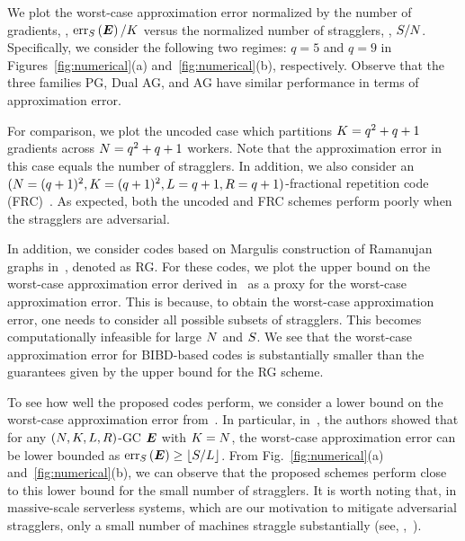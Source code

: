 \documentclass[conference,letterpaper]{IEEEtran}
\begin{document}
We plot the worst-case approximation error normalized by the number of gradients, \ie, $\mathrm{err}_{S}\left(\boldsymbol{E}\right)/K$ versus the normalized number of stragglers, \ie, $S/N$. Specifically, we consider the following two regimes: $q = 5$ and $q = 9$ in Figures~\ref{fig:numerical}(a) and~\ref{fig:numerical}(b), respectively. Observe that the three families PG, Dual AG, and AG have similar performance in terms of approximation error.

For comparison, we plot the uncoded case which partitions $K = q^2+q+1$ gradients across $N = q^2+q+1$ workers. Note that the approximation error in this case equals the number of stragglers. 
In addition, we also consider an \mbox{$(N = (q+1)^2, K = (q+1)^2, L = q+1, R = q+1)$}-fractional repetition code (FRC)~\cite{Tandon:17,CharlesP:17}. As expected, both the uncoded and FRC schemes perform poorly when the stragglers are adversarial.

In addition, we consider codes based on Margulis construction of Ramanujan graphs in~\cite[Example 19]{Raviv:18}, denoted as RG. For these codes, we plot the upper bound on the worst-case approximation error derived in~\cite{Raviv:18} as a proxy for the worst-case approximation error. This is because, to obtain the worst-case approximation error, one needs to consider all possible subsets of stragglers. This becomes computationally infeasible for large $N$ and $S$. We see that the worst-case approximation error for BIBD-based codes is substantially smaller than the guarantees given by the upper bound for the RG scheme.

To see how well the proposed codes perform, we consider a lower bound on the worst-case approximation error from~\cite{Raviv:18}. In particular, in~\cite[Lemma 21]{Raviv:18}, the authors showed that for any $(N,K,L,R)$-GC $\boldsymbol{E}$ with $K = N$, the worst-case approximation error can be lower bounded as $\mathrm{err}_{S}\left(\boldsymbol{E}\right)\geq \lfloor S/L \rfloor$. %
From Fig.~\ref{fig:numerical}(a) and~\ref{fig:numerical}(b), we can observe that the proposed schemes perform close to this lower bound for the small number of stragglers. {It is worth noting that, in massive-scale serverless systems, which are our motivation to mitigate adversarial stragglers, only a small number of machines straggle substantially (see, \eg,~\cite[Fig.~1]{Gupta:oversketch:18}).}
\end{document}
